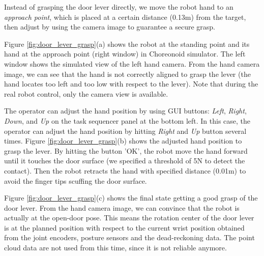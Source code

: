 Instead of grasping the door lever directly, we move the robot hand to an {\it approach point},
which is placed at a certain distance (0.13m) from the target, then adjust
by using the camera image to guarantee a secure grasp. 




Figure \ref{fig:door_lever_grasp}(a) shows the robot at the standing point and its hand at the
approach point (right window) in Choreonoid simulator.
The left window shows the simulated view of the left hand camera.
From the hand camera image, we can see that the hand is not correctly aligned 
to grasp the lever (the hand locates too left and too low with respect to the 
lever). 
Note that during the real robot control, only the camera view is available. 

The operator can adjust the hand position by using GUI buttons: 
{\it Left}, {\it Right}, {\it Down}, and {\it Up} on the task sequencer panel at the bottom left.
In this case, the operator can adjust the hand position by hitting {\it Right} and {\it Up} button
several times.
Figure \ref{fig:door_lever_grasp}(b) shows the adjusted hand position to grasp the lever.
By hitting the button 'OK', the robot move the hand forward until it touches the door surface (we specified a threshold of 5N to detect the contact).  Then the robot retracts the hand with specified distance (0.01m) to avoid the finger tips scuffing the door surface.

Figure \ref{fig:door_lever_grasp}(c) shows the final state getting a good grasp of the door lever.
From the hand camera image, we can convince that the robot is actually at the open-door pose.
This means the rotation center of the door lever is at the planned position with respect to the 
current wrist position obtained from the joint encoders, posture sensors and the dead-reckoning data.
The point cloud data are not used from this time, since it is not reliable anymore.

